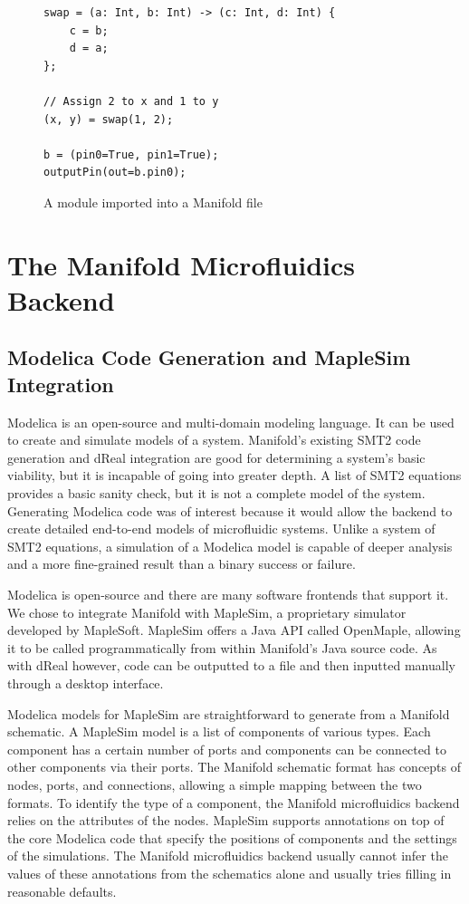 \begin{figure}[!ht]
\label{fig:unpacking}
\caption{A module imported into a Manifold file}
\begin{lstlisting}
swap = (a: Int, b: Int) -> (c: Int, d: Int) {
    c = b;
    d = a;
};

// Assign 2 to x and 1 to y
(x, y) = swap(1, 2);

b = (pin0=True, pin1=True);
outputPin(out=b.pin0);
\end{lstlisting}
\end{figure}

\section{The Manifold Microfluidics Backend}

\subsection{Modelica Code Generation and MapleSim Integration}

Modelica is an open-source and multi-domain modeling language.
It can be used to create and simulate models of a system.
Manifold's existing SMT2 code generation and dReal integration are good for determining a system's basic viability, but it is incapable of going into greater depth.
A list of SMT2 equations provides a basic sanity check, but it is not a complete model of the system.
Generating Modelica code was of interest because it would allow the backend to create detailed end-to-end models of microfluidic systems.
Unlike a system of SMT2 equations, a simulation of a Modelica model is capable of deeper analysis and a more fine-grained result than a binary success or failure.

Modelica is open-source and there are many software frontends that support it.
We chose to integrate Manifold with MapleSim, a proprietary simulator developed by MapleSoft.
MapleSim offers a Java API called OpenMaple, allowing it to be called programmatically from within Manifold's Java source code.
As with dReal however, code can be outputted to a file and then inputted manually through a desktop interface.

Modelica models for MapleSim are straightforward to generate from a Manifold schematic.
A MapleSim model is a list of components of various types.
Each component has a certain number of ports and components can be connected to other components via their ports.
The Manifold schematic format has concepts of nodes, ports, and connections, allowing a simple mapping between the two formats.
To identify the type of a component, the Manifold microfluidics backend relies on the attributes of the nodes.
MapleSim supports annotations on top of the core Modelica code that specify the positions of components and the settings of the simulations.
The Manifold microfluidics backend usually cannot infer the values of these annotations from the schematics alone and usually tries filling in reasonable defaults.

